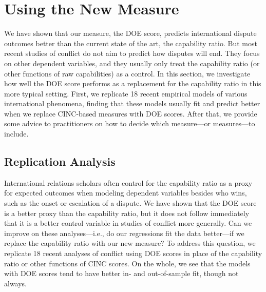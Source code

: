 \section{Using the New Measure}
\label{sec:replications}

We have shown that our measure, the DOE score, predicts international dispute outcomes better than the current state of the art, the capability ratio.
But most recent studies of conflict do not aim to predict how disputes will end.
They focus on other dependent variables, and they usually only treat the capability ratio (or other functions of raw capabilities) as a control.
In this section, we investigate how well the DOE score performs as a replacement for the capability ratio in this more typical setting.
First, we replicate 18 recent empirical models of various international phenomena, finding that these models usually fit and predict better when we replace CINC-based measures with DOE scores.
After that, we provide some advice to practitioners on how to decide which measure---or measures---to include.

\subsection{Replication Analysis}

International relations scholars often control for the capability ratio as a proxy for expected outcomes when modeling dependent variables besides who wins, such as the onset or escalation of a dispute.
We have shown that the DOE score is a better proxy than the capability ratio, but it does not follow immediately that it is a better control variable in studies of conflict more generally.
Can we improve on these analyses---i.e., do our regressions fit the data better---if we replace the capability ratio with our new measure?
To address this question, we replicate 18 recent analyses of conflict using DOE scores in place of the capability ratio or other functions of CINC scores.
On the whole, we see that the models with DOE scores tend to have better in- and out-of-sample fit, though not always.

